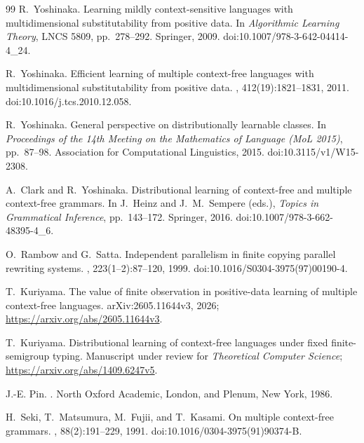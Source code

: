 \documentclass[11pt]{article}
\numberwithin{equation}{section}
\theoremstyle{plain}
\theoremstyle{definition}
\theoremstyle{remark}
\theoremstyle{plain}
\begin{document}
\begin{thebibliography}{99}
R.~Yoshinaka.
\newblock Learning mildly context-sensitive languages with multidimensional
 substitutability from positive data.
\newblock In {\em Algorithmic Learning Theory}, LNCS 5809, pp.~278--292.
 Springer, 2009.
\newblock doi:10.1007/978-3-642-04414-4\_24.

R.~Yoshinaka.
\newblock Efficient learning of multiple context-free languages with
multidimensional substitutability from positive data.
, 412(19):1821--1831, 2011.
\newblock doi:10.1016/j.tcs.2010.12.058.

R.~Yoshinaka.
\newblock General perspective on distributionally learnable classes.
\newblock In \emph{Proceedings of the 14th Meeting on the Mathematics
of Language (MoL 2015)}, pp.~87--98.
Association for Computational Linguistics, 2015.
\newblock doi:10.3115/v1/W15-2308.

A.~Clark and R.~Yoshinaka.
\newblock Distributional learning of context-free and multiple context-free grammars.
\newblock In J.~Heinz and J.~M.~Sempere (eds.), \emph{Topics in Grammatical
Inference}, pp.~143--172. Springer, 2016.
\newblock doi:10.1007/978-3-662-48395-4\_6.

O.~Rambow and G.~Satta.
\newblock Independent parallelism in finite copying parallel rewriting systems.
, 223(1--2):87--120, 1999.
\newblock doi:10.1016/S0304-3975(97)00190-4.

T.~Kuriyama.
\newblock The value of finite observation in positive-data learning
of multiple context-free languages.
\newblock arXiv:2605.11644v3, 2026;
\url{https://arxiv.org/abs/2605.11644v3}.

T.~Kuriyama.
\newblock Distributional learning of context-free languages under fixed
finite-semigroup typing.
\newblock Manuscript under review for \emph{Theoretical Computer Science};
\url{https://arxiv.org/abs/1409.6247v5}.

J.-E. Pin.
.
\newblock North Oxford Academic, London, and Plenum, New York, 1986.

H.~Seki, T.~Matsumura, M.~Fujii, and T.~Kasami.
\newblock On multiple context-free grammars.
, 88(2):191--229, 1991.
\newblock doi:10.1016/0304-3975(91)90374-B.


\end{thebibliography}
\end{document}
